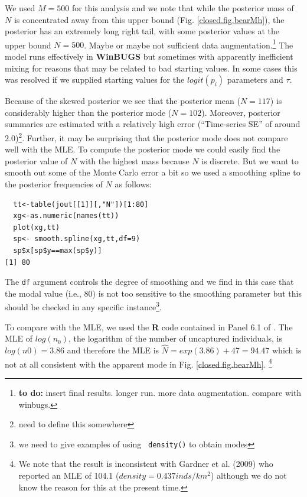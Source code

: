 We used $M=500$ for this analysis and we
note that  while the posterior mass of $N$ is concentrated away from this
upper bound (Fig. \ref{closed.fig.bearMh}), the posterior has an
extremely long right tail, with some posterior values at the upper
bound $N=500$. Maybe or
maybe not sufficient data augmentation.\footnote{
{\bf to do: } insert final results. longer run. more data
augmentation. compare with winbugs.
}
The model runs effectively in {\bf WinBUGS} but sometimes with apparently
inefficient mixing for reasons that may be related to bad starting
values. In some cases this was resolved if we supplied starting values
for the $logit(p_{i})$ parameters and $\tau$.


Because of the skewed posterior we see that the posterior mean ($N=117$)
is
considerably higher than the posterior mode ($N=102$). Moreover, 
posterior summaries are estimated with a relatively high error
(``Time-series SE'' of around 2.0)\footnote{need to define this somewhere}.
Further, it may be surprising that the posterior mode does not compare
well with the MLE. To compute the posterior mode we could easily find
the posterior value of $N$ with the highest mass because $N$ is
discrete. But we want to smooth out some of the Monte Carlo error a
bit so we used a smoothing spline to the posterior frequencies of $N$
as follows:
\begin{verbatim}
  tt<-table(jout[[1]][,"N"])[1:80]
  xg<-as.numeric(names(tt))
  plot(xg,tt)
  sp<- smooth.spline(xg,tt,df=9)
  sp$x[sp$y==max(sp$y)]
[1] 80
\end{verbatim}
The \mbox{\tt df} argument controls the degree of smoothing and we
find in this case that the modal value (i.e., 80) is not too sensitive
to the smoothing parameter but this should be checked in any specific
instance\footnote{we need to give examples of using \mbox{\tt
    density()} to obtain modes}.

To compare with the MLE, we used 
the {\bf R} code contained in Panel 6.1 of \citet{royle_dorazio:2008}.  The
MLE of $log(n_{0})$, the logarithm of the number of uncaptured
individuals, is $log(n0) = 3.86$ and therefore the MLE is $\hat{N} =
exp(3.86)+47 = 94.47$ which is not at all consistent with the apparent
mode in 
Fig. \ref{closed.fig.bearMh}.
\footnote{We note that the result is inconsistent with Gardner et
  al. (2009) who reported an MLE of 104.1 ($density = 0.437
  inds/km^2$) although we do not know the reason for this at the
  present time.}  

